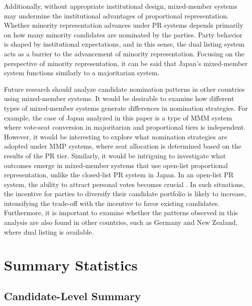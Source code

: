 \documentclass[a4paper, 11pt]{article}
\begin{document}
Additionally, without appropriate institutional design, mixed-member systems may undermine the institutional advantages of proportional representation. Whether minority representation advances under PR systems depends primarily on how many minority candidates are nominated by the parties. Party behavior is shaped by institutional expectations, and in this sense, the dual listing system acts as a barrier to the advancement of minority representation. Focusing on the perspective of minority representation, it can be said that Japan's mixed-member system functions similarly to a majoritarian system.

Future research should analyze candidate nomination patterns in other countries using mixed-member systems. It would be desirable to examine how different types of mixed-member systems generate differences in nomination strategies. For example, the case of Japan analyzed in this paper is a type of MMM system where vote-seat conversion in majoritarian and proportional tiers is independent. However, it would be interesting to explore what nomination strategies are adopted under MMP systems, where seat allocation is determined based on the results of the PR tier. Similarly, it would be intriguing to investigate what outcomes emerge in mixed-member systems that use open-list proportional representation, unlike the closed-list PR system in Japan. In an open-list PR system, the ability to attract personal votes becomes crucial \citep{nemoto_localism_2013, shugart_looking_2005}. In such situations, the incentive for parties to diversify their candidate portfolio is likely to increase, intensifying the trade-off with the incentive to favor existing candidates. Furthermore, it is important to examine whether the patterns observed in this analysis are also found in other countries, such as Germany and New Zealand, where dual listing is available.

\newpage




\newpage

\appendix

\setcounter{table}{0}
\setcounter{figure}{0}
\renewcommand{\thetable}{A\arabic{table}}
\renewcommand{\thefigure}{A\arabic{figure}}

\section{Summary Statistics}

\subsection{Candidate-Level Summary}
\end{document}
